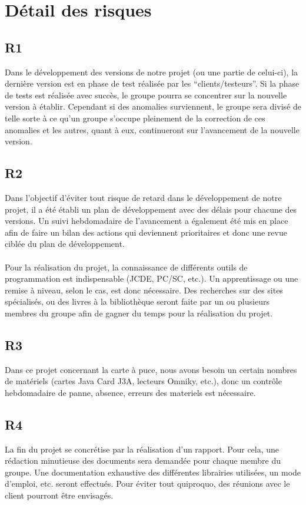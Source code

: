 \documentclass[a4paper,11pt,french]{article}
\begin{document}
\clearpage
\section{Détail des risques}

\subsection*{R1}
Dans le développement des versions de notre projet (ou une partie de celui-ci),
la dernière version est en phase de test réalisée par les ``clients/testeurs''.
Si la phase de tests est réalisée avec succès, le groupe pourra se concentrer
sur la nouvelle version à établir. Cependant si des anomalies surviennent, le
groupe sera divisé de telle sorte à ce qu'un groupe s'occupe pleinement de la
correction de ces anomalies et les autres, quant à eux, continueront sur
l'avancement de la nouvelle version.

\subsection*{R2}
Dans l'objectif d'éviter tout risque de retard dans le développement de notre
projet, il a été établi un plan de développement avec des délais pour chacune
des versions. Un suivi hebdomadaire de l'avancement a également été mis en place
afin de faire un bilan des actions qui deviennent prioritaires et donc une revue
ciblée du plan de développement.
\paragraph{}
Pour la réalisation du projet, la connaissance de différents outils de
programmation est indispensable (JCDE, PC/SC, etc.). Un apprentissage ou
une remise à niveau, selon le cas, est donc nécessaire. Des recherches sur des
sites spécialisés, ou des livres à la bibliothèque seront faite par un ou
plusieurs membres du groupe afin de gagner du temps pour la réalisation du
projet.


\subsection*{R3}
Dans ce projet concernant la carte à puce, nous avons besoin un certain nombres 
de matériels (cartes Java Card J3A, lecteurs Omniky, etc.), donc un contrôle 
hebdomadaire de panne, absence, erreurs des materiels est nécessaire. 


\subsection*{R4}
La fin du projet se concrétise par la réalisation d'un rapport. Pour cela, une
rédaction minutieuse des documents sera demandée pour chaque membre du groupe.
Une documentation exhaustive des différentes librairies utilisées, un mode
d'emploi, etc. seront effectués. Pour éviter tout quiproquo, des réunions avec
le client pourront être envisagés.
\end{document}
